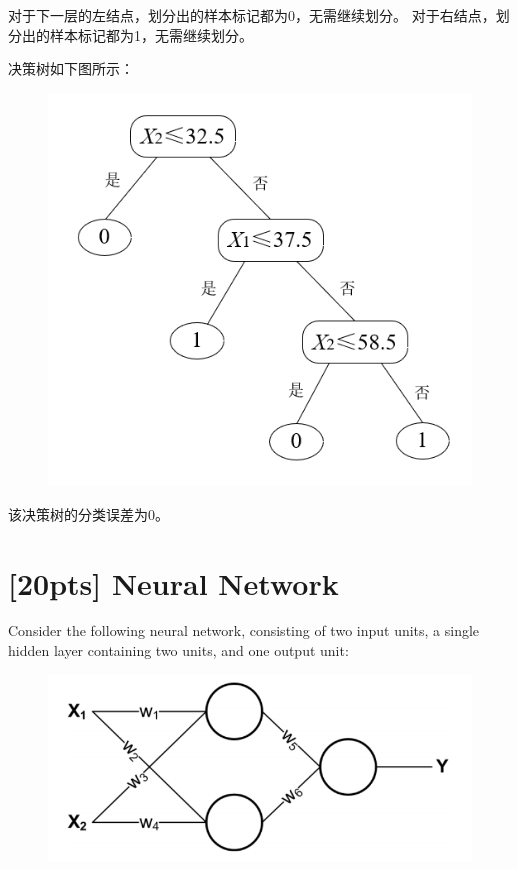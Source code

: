 \documentclass{article}
\begin{document}
	对于下一层的左结点，划分出的样本标记都为0，无需继续划分。
	对于右结点，划分出的样本标记都为1，无需继续划分。

	决策树如下图所示：
	\begin{figure}[H]
		\centering
		\includegraphics[scale=0.7]{p1-dt2.PNG}
	\end{figure}

	该决策树的分类误差为0。
	



	\newpage
	\section{[20pts] Neural Network}
	\noindent Consider the following neural network, consisting of two input units, a single hidden layer containing two units, and one output unit:
	
	\begin{figure}[htbp]
		\centering
		\includegraphics[scale=0.5]{p2-nn1.png}
	\end{figure}
\end{document}
